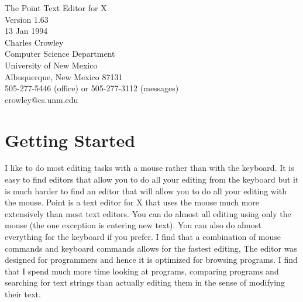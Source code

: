 

\sloppy

\textwidth      6.5in
\oddsidemargin  0in
\evensidemargin 0in

\topmargin      0in
\headheight     0in
\headsep        0in
\textheight     8.5in
\topskip        0in

\parindent      0in
\parskip        5pt



\thispagestyle{empty}

\vspace*{2in}

\begin{center}
\Huge
The Point Text Editor for X \\
\vspace{0.35in}
\Large
Version 1.63 \\
13 Jan 1994 \\
\vspace{1in}
Charles Crowley \\
Computer Science Department \\
University of New Mexico \\
Albuquerque, New Mexico 87131 \\
505-277-5446 (office) or 505-277-3112 (messages) \\
crowley@cs.unm.edu
\end{center}

\newpage

\tableofcontents

\newpage



\section{Getting Started}

I like to do most editing tasks with a mouse rather than with the
keyboard.
It is easy to find editors that allow you to do all your editing from
the keyboard but it is much harder to find an editor that will
allow you to do all your editing with the mouse.
Point is a text editor for X that uses the mouse much more extensively
than most text editors.
You can do almost all editing using only the mouse
(the one exception is entering new text).
You can also do almost everything for the keyboard if you prefer.
I find that a combination of mouse commands and keyboard commands
allows for the fastest editing,
The editor was designed for programmers and hence it is optimized
for browsing programs.
I find that I spend much more time looking at programs,
comparing programs and searching for text strings
than actually editing them in the sense of modifying their text.

